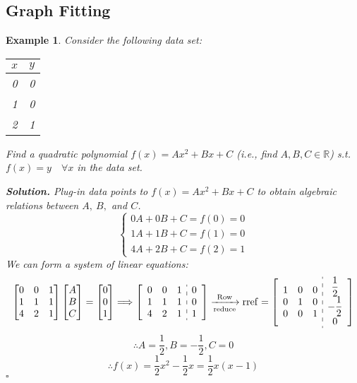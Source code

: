 \documentclass[12pt, a4paper]{article}
\newtheorem{eg}{Example}[subsection]
\newenvironment*{sol}{\par\indent\textbf{\textit{Solution. }}}{\hfill{$\square$}\par}
\def\R{{\mathbb{R}}}
\def\C{{\mathbb{C}}}
\def\rref{\mathrm{rref}}
\begin{document}
\subsection{Graph Fitting}
\begin{eg}
	Consider the following data set: \begin{center}\begin{tabular}{c|c}$x$&$y$\\\hline0&0\\1&0\\2&1\end{tabular}\end{center} Find a quadratic polynomial $f(x)=Ax^2+Bx+C$ (i.e., find $A,B,C\in\R$) \emph{s.t.} $f(x)=y\quad\forall x$ in the data set.\\ 
	\begin{sol}
		Plug-in data points to $f(x)=Ax^2+Bx+C$ to obtain algebraic relations between $A,\ B,$ and $C$.
		\[\begin{cases}0A+0B+C=f(0)=0\\1A+1B+C=f(1)=0\\4A+2B+C=f(2)=1\end{cases}\]	
		We can form a system of linear equations: 
		\[\begin{bmatrix}0&0&1\\1&1&1\\4&2&1\end{bmatrix}\begin{bmatrix}A\\B\\C\end{bmatrix}=\begin{bmatrix}0\\0\\1\end{bmatrix}\Longrightarrow\left[\begin{array}{c:c}\begin{matrix}0&0&1\\1&1&1\\4&2&1\end{matrix}&\begin{matrix}0\\0\\1\end{matrix}\end{array}\right]\xrightarrow[\text{reduce}]{\text{Row}}\rref=\left[\begin{array}{c:c}\begin{matrix}1&0&0\\0&1&0\\0&0&1\end{matrix}&\begin{matrix}\dfrac{1}{2}\\-\dfrac{1}{2}\\0\end{matrix}\end{array}\right]\]
		\[\therefore A=\frac{1}{2}, B=-\frac{1}{2}, C=0\]
		\[\therefore f(x)=\frac{1}{2}x^2-\frac{1}{2}x=\frac{1}{2}x(x-1)\]
	\end{sol}
\end{eg}
\end{document}
